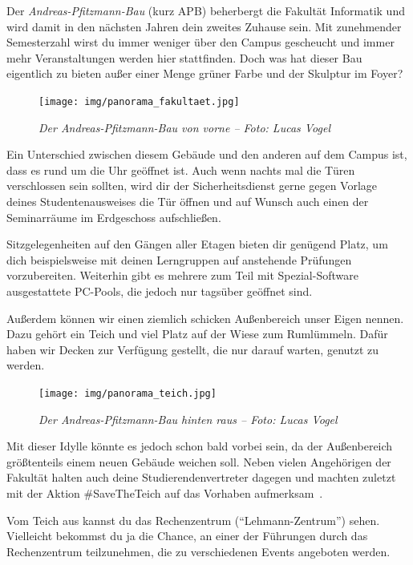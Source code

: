 
Der \emph{Andreas-Pfitzmann-Bau} (kurz APB) beherbergt die Fakultät Informatik und wird damit in den nächsten Jahren dein zweites Zuhause sein.
Mit zunehmender Semesterzahl wirst du immer weniger über den Campus gescheucht und immer mehr Veranstaltungen werden hier stattfinden.
Doch was hat dieser Bau eigentlich zu bieten außer einer Menge grüner Farbe und der Skulptur im Foyer?

\begin{figure}[h!]
    \centering
    \texttt{[image: img/panorama\_fakultaet.jpg]}
    \caption*{\small \textit{Der Andreas-Pfitzmann-Bau von vorne -- Foto: Lucas Vogel}}
\end{figure}

Ein Unterschied zwischen diesem Gebäude und den anderen auf dem Campus ist, dass es rund um die Uhr geöffnet ist. Auch wenn nachts mal die Türen verschlossen sein sollten, wird dir der Sicherheitsdienst gerne gegen Vorlage deines Studentenausweises die Tür öffnen und auf Wunsch auch einen der Seminarräume im Erdgeschoss aufschließen.

Sitzgelegenheiten auf den Gängen aller Etagen bieten dir genügend Platz, um dich beispielsweise mit deinen Lerngruppen auf anstehende Prüfungen vorzubereiten. Weiterhin gibt es mehrere zum Teil mit Spezial-Software ausgestattete PC-Pools, die jedoch nur tagsüber geöffnet sind.

Außerdem können wir einen ziemlich schicken Außenbereich unser Eigen nennen. Dazu gehört ein Teich und viel Platz auf der Wiese zum Rumlümmeln. Dafür haben wir Decken zur Verfügung gestellt, die nur darauf warten, genutzt zu werden.

\begin{figure}[t]
    \centering
    \texttt{[image: img/panorama\_teich.jpg]}
    \caption*{\small \textit{Der Andreas-Pfitzmann-Bau hinten raus -- Foto: Lucas Vogel}}
\end{figure}

Mit dieser Idylle könnte es jedoch schon bald vorbei sein, da der Außenbereich größtenteils einem neuen Gebäude weichen soll. Neben vielen Angehörigen der Fakultät halten auch deine Studierendenvertreter dagegen und machten zuletzt mit der Aktion \#SaveTheTeich auf das Vorhaben aufmerksam~.

Vom Teich aus kannst du das Rechenzentrum (\enquote{Lehmann-Zentrum}) sehen. Vielleicht bekommst du ja die Chance, an einer der Führungen durch das Rechenzentrum teilzunehmen, die zu verschiedenen Events angeboten werden.

